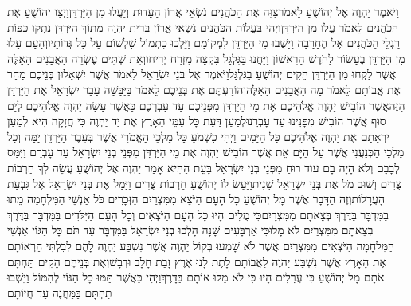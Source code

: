 \documentclass[../main/main.tex]{subfiles}
\begin{document}
\begin{multicols*}{\ncols}
וַיֹּאמֶר יַהְוֶה אֶל יְהוֹשֻׁעַ לֵאמֹר\PreVerseSpace{}צַוֵּה אֶת הַכֹּהֲנִים נֹשְׂאֵי אֲרוֹן הָעֵדוּת וְיַעֲלוּ מִן הַיַּרְדֵּן\PreVerseSpace{}וַיְצַו יְהוֹשֻׁעַ אֶת הַכֹּהֲנִים לֵאמֹר עֲלוּ מִן הַיַּרְדֵּן\PreVerseSpace{}וַיְהִי בַּעֲלוֹת הַכֹּהֲנִים נֹשְׂאֵי אֲרוֹן בְּרִית יַהְוֶה מִתּוֹךְ הַיַּרְדֵּן נִתְּקוּ כַּפּוֹת רַגְלֵי הַכֹּהֲנִים אֶל הֶחָרָבָה וַיָּשֻׁבוּ מֵי הַיַּרְדֵּן לִמְקוֹמָם וַיֵּלְכוּ כִתְמוֹל שִׁלְשׁוֹם עַל כָּל גְּדוֹתָיו\PreVerseSpace{}וְהָעָם עָלוּ מִן הַיַּרְדֵּן בֶּעָשׂוֹר לַחֹדֶשׁ הָרִאשׁוֹן וַיַּחֲנוּ בַּגִּלְגָּל בִּקְצֵה מִזְרַח יְרִיחוֹ\PreVerseSpace{}וְאֵת שְׁתֵּים עֶשְׂרֵה הָאֲבָנִים הָאֵלֶּה אֲשֶׁר לָקְחוּ מִן הַיַּרְדֵּן הֵקִים יְהוֹשֻׁעַ בַּגִּלְגָּל\PreVerseSpace{}וַיֹּאמֶר אֶל בְּנֵי יִשְׂרָאֵל לֵאמֹר אֲשֶׁר יִשְׁאָלוּן בְּנֵיכֶם מָחָר אֶת אֲבוֹתָם לֵאמֹר מָה הָאֲבָנִים הָאֵלֶּה\PreVerseSpace{}וְהוֹדַעְתֶּם אֶת בְּנֵיכֶם לֵאמֹר בַּיַּבָּשָׁה עָבַר יִשְׂרָאֵל אֶת הַיַּרְדֵּן הַזֶּה\PreVerseSpace{}אֲשֶׁר הוֹבִישׁ יַהְוֶה אֱלֹהֵיכֶם אֶת מֵי הַיַּרְדֵּן מִפְּנֵיכֶם עַד עָבְרְכֶם כַּאֲשֶׁר עָשָׂה יַהְוֶה אֱלֹהֵיכֶם לְיַם סוּף אֲשֶׁר הוֹבִישׁ מִפָּנֵינוּ עַד עָבְרֵנוּ\PreVerseSpace{}לְמַעַן דַּעַת כָּל עַמֵּי הָאָרֶץ אֶת יַד יַהְוֶה כִּי חֲזָקָה הִיא לְמַעַן יִרְאָתָם אֶת יַהְוֶה אֱלֹהֵיכֶם כָּל הַיָּמִים \ClosedSection{}וַיְהִי כִשְׁמֹעַ כָּל מַלְכֵי הָאֱמֹרִי אֲשֶׁר בְּעֵבֶר הַיַּרְדֵּן יָמָּה וְכָל מַלְכֵי הַכְּנַעֲנִי אֲשֶׁר עַל הַיָּם אֵת אֲשֶׁר הוֹבִישׁ יַהְוֶה אֶת מֵי הַיַּרְדֵּן מִפְּנֵי בְנֵי יִשְׂרָאֵל עַד עָבְרָם\SubEnd{} וַיִּמַּס לְבָבָם וְלֹא הָיָה בָם עוֹד רוּחַ מִפְּנֵי בְּנֵי יִשְׂרָאֵל \ClosedSection{}בָּעֵת הַהִיא אָמַר יַהְוֶה אֶל יְהוֹשֻׁעַ עֲשֵׂה לְךָ חַרְבוֹת צֻרִים וְשׁוּב מֹל אֶת בְּנֵי יִשְׂרָאֵל שֵׁנִית\PreVerseSpace{}וַיַּעַשׂ לוֹ יְהוֹשֻׁעַ חַרְבוֹת צֻרִים וַיָּמָל אֶת בְּנֵי יִשְׂרָאֵל אֶל גִּבְעַת הָעֲרָלוֹת\PreVerseSpace{}וְזֶה הַדָּבָר אֲשֶׁר מָל יְהוֹשֻׁעַ כָּל הָעָם הַיֹּצֵא מִמִּצְרַיִם הַזְּכָרִים כֹּל אַנְשֵׁי הַמִּלְחָמָה מֵתוּ בַמִּדְבָּר בַּדֶּרֶךְ בְּצֵאתָם מִמִּצְרָיִם\PreVerseSpace{}כִּי מֻלִים הָיוּ כָּל הָעָם הַיֹּצְאִים וְכָל הָעָם הַיִּלֹּדִים בַּמִּדְבָּר בַּדֶּרֶךְ בְּצֵאתָם מִמִּצְרַיִם לֹא מָלוּ\PreVerseSpace{}כִּי אַרְבָּעִים שָׁנָה הָלְכוּ בְנֵי יִשְׂרָאֵל בַּמִּדְבָּר עַד תֹּם כָּל הַגּוֹי אַנְשֵׁי הַמִּלְחָמָה הַיֹּצְאִים מִמִּצְרַיִם אֲשֶׁר לֹא שָׁמְעוּ בְּקוֹל יַהְוֶה אֲשֶׁר נִשְׁבַּע יַהְוֶה לָהֶם לְבִלְתִּי הַרְאוֹתָם אֶת הָאָרֶץ אֲשֶׁר נִשְׁבַּע יַהְוֶה לַאֲבוֹתָם לָתֶת לָנוּ אֶרֶץ זָבַת חָלָב וּדְבָשׁ\PreVerseSpace{}וְאֶת בְּנֵיהֶם הֵקִים תַּחְתָּם אֹתָם מָל יְהוֹשֻׁעַ כִּי עֲרֵלִים הָיוּ כִּי לֹא מָלוּ אוֹתָם בַּדָּרֶךְ\PreVerseSpace{}וַיְהִי כַּאֲשֶׁר תַּמּוּ כָל הַגּוֹי לְהִמּוֹל וַיֵּשְׁבוּ תַחְתָּם בַּמַּחֲנֶה עַד חֲיוֹתָם\OpenSection{}\par

\end{multicols*}
\end{document}
